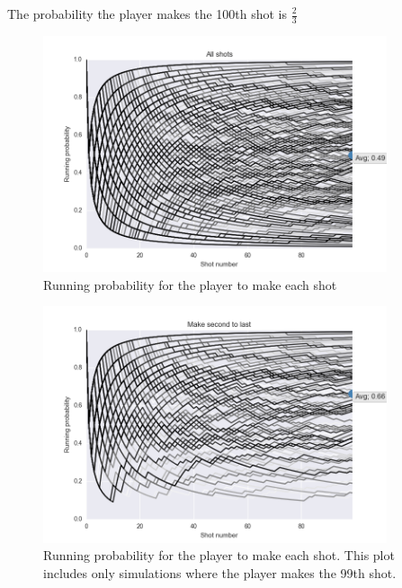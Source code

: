 \documentclass[12]{article}
\begin{document}
The probability the player makes the 100th shot is $\frac{2}{3}$

\begin{figure}
\begin{center}
  \includegraphics[width=0.9\textwidth]{figs/all_shots.png}
\end{center}
\caption{Running probability for the player to make each shot}
\label{fig:}
\end{figure}

\begin{figure}
\begin{center}
  \includegraphics[width=0.9\textwidth]{figs/make_99.png}
\end{center}
\caption{Running probability for the player to make each shot. This plot
         includes only simulations where the player makes the 99th shot.}
\label{fig:}
\end{figure}
\end{document}
